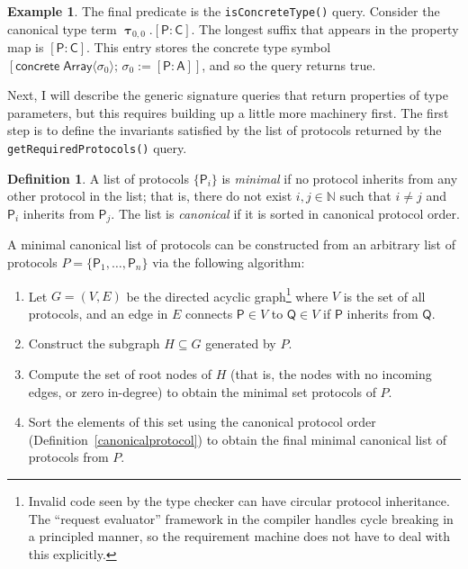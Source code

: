 \documentclass[a4paper,headsepline,bibliography=totoc,toc=flat,fleqn,twoside=semi]{scrbook}
\theoremstyle{definition}
\newtheorem{definition}{Definition}[chapter]
\theoremstyle{definition}
\newtheorem{example}{Example}[chapter]
\theoremstyle{definition}
\newcommand{\namesym}[1]{\mathsf{#1}}
\newcommand{\proto}[1]{\bm{\mathsf{#1}}}
\newcommand{\genericsym}[2]{\bm{\uptau}_{#1,#2}}
\newcommand{\assocsym}[2]{[\proto{#1}\colon\namesym{#2}]}
\newcommand{\concretesym}[1]{[\mathsf{concrete}\;#1]}
\begin{document}
\begin{example}
The final predicate is the \texttt{isConcreteType()} query. Consider the canonical type term $\genericsym{0}{0}.\assocsym{P}{C}$. The longest suffix that appears in the property map is $\assocsym{P}{C}$. This entry stores the concrete type symbol $\concretesym{\namesym{Array}\langle\sigma_0\rangle;\,\sigma_0:=\assocsym{P}{A}}$, and so the query returns true.
\end{example}

Next, I will describe the generic signature queries that return properties of type parameters, but this requires building up a little more machinery first. The first step is to define the invariants satisfied by the list of protocols returned by the \texttt{getRequiredProtocols()} query.

\begin{definition}\label{minimalproto} A list of protocols $\{\proto{P}_i\}$ is \emph{minimal} if
no
protocol inherits from any other protocol in the list; that is, there do not exist $i,
j\in\mathbb{N}$ such that $i\neq j$ and $\proto{P}_i$ inherits from $\proto{P}_j$. The list is
\emph{canonical}
if it is sorted in canonical protocol order.

A minimal canonical list of protocols
can be constructed from an arbitrary list of protocols
$P=\{\proto{P}_1,\ldots,\proto{P}_n\}$ via the following algorithm:
\begin{enumerate}
\item Let $G=(V, E)$ be the directed acyclic graph\footnote{Invalid code seen by the
type checker can have circular protocol inheritance. The ``request evaluator''
framework in the compiler handles cycle breaking in a principled manner, so the
requirement machine does not have to deal with this explicitly.} where $V$ is the set
of all protocols, and an edge in $E$ connects $\proto{P}\in V$ to $\proto{Q}\in V$ if
$\proto{P}$ inherits from $\proto{Q}$.
\item Construct the subgraph $H\subseteq G$ generated by $P$.
\item Compute the set of root nodes of $H$ (that is, the nodes with no incoming edges, or zero in-degree) to obtain the minimal set protocols of
$P$.
\item Sort the elements of this set using the canonical protocol order (Definition~\ref{canonicalprotocol}) to obtain the
final minimal canonical list of protocols from $P$.
\end{enumerate}
\end{definition}
\end{document}
